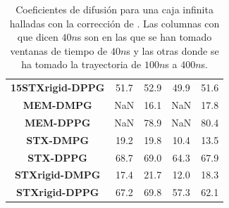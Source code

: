 \begin{appendix}
\begin{table}
\begin{tabular}{|c|c|c|c|c|}
\textbf{15STXrigid-DPPG} &51.7 &52.9 &49.9 &51.6 \\
\textbf{MEM-DMPG       } & NaN &16.1 & NaN &17.8 \\
\textbf{MEM-DPPG       } & NaN &78.9 & NaN &80.4 \\
\textbf{STX-DMPG       } &19.2 &19.8 &10.4 &13.5 \\
\textbf{STX-DPPG       } &68.7 &69.0 &64.3 &67.9 \\
\textbf{STXrigid-DMPG  } &17.4 &21.7 &12.0 &18.3 \\
\textbf{STXrigid-DPPG  } &67.2 &69.8 &57.3 &62.1 \\
\bottomrule
\end{tabular}
    \caption{Coeficientes de difusi\'{o}n para una caja infinita halladas con la correcci\'{o}n de \cite{Vogele2016DivergentMembranes}. Las columnas con que dicen $40n$s son en las que se han tomado ventanas de tiempo de $40n$s y las otras donde se ha tomado la trayectoria de $100n$s a $400n$s.}
    \label{tab:dinf}
\end{table}




\end{appendix}
